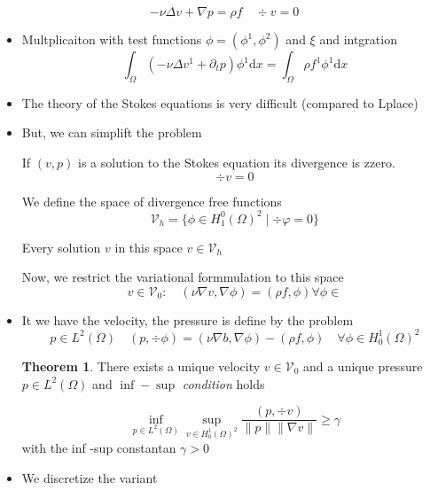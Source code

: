 \documentclass[openany,a4paper,11pt]{memoir}
\theoremstyle{definition}
\newtheorem{theorem}{Theorem}
\begin{document}
\[ -\nu\Delta v+\nabla p = \rho f\quad \div v = 0\]

\begin{itemize}
\item Multplicaiton with test functions $\phi=(\phi^1,\phi^2)$ and $\xi$ and intgration
  \[ \int_\Omega(-\nu\Delta v^1+\partial_t p)\phi^1\mathrm{d}x=\int_\Omega\rho f^1\phi^1\mathrm{d}x \]%
\end{itemize}

\begin{itemize}
\item The theory of the Stokes equations is very difficult (compared to Lplace)%
  
\item But, we can simplift the problem

  If $(v,p)$ is a solution to the Stokes equation its divergence is zzero. \[ \div v=0\]

  We define the space of divergence free functions \[ \mathcal{V}_h=\{\phi\in H^0_1(\Omega)^2\mid \div\varphi=0\} \]

  Every solution $v$ in this space $v\in\mathcal{V}_h$

  Now, we restrict the variational formmulation to this space
  \[v\in\mathcal{V}_0\colon\quad (\nu\nabla v,\nabla \phi) = (\rho f,\phi) \forall \phi\in \]
  
\end{itemize}

\begin{itemize}
\item It we have the velocity, the pressure is define by the problem \[p\in L^2(\Omega)\quad (p,\div\phi)=(\nu\nabla b,\nabla\phi)-(\rho f,\phi)\quad\forall\phi\in H^1_0(\Omega)^2 \]

  \begin{theorem}
    There exists a unique velocity $v\in\mathcal{V}_0$ and a unique pressure $p\in L^2(\Omega)$ and $\inf-\sup$ \textit{condition} holds

    \[ \inf_{p\in L^2(\Omega)}\sup_{v\in H^1_0(\Omega)^2}\frac{(p,\div v)}{\|p\|\|\nabla v\|}\ge\gamma \] with the inf -sup constantan $\gamma>0$
  \end{theorem}
\end{itemize}

\begin{itemize}
\item We discretize the variant
\end{itemize}
\end{document}
